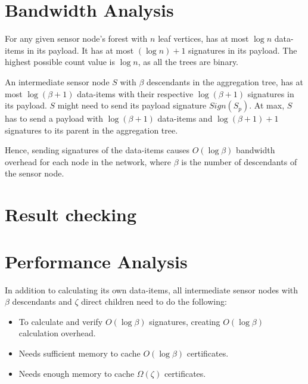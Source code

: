 	
\section{Bandwidth Analysis}
	For any given sensor node's forest with $n$ leaf vertices, has at most $\log n$ data-items in its payload.
	It has at most $(\log n) +1$ signatures in its payload.
	The highest possible count value is $\log n$, as all the trees are binary. 

	An intermediate sensor node $S$ with $\beta$ descendants in the aggregation tree, has at most $\log(\beta+1)$ data-items with their respective $\log(\beta+1)$ signatures in its payload.
	$S$ might need to send its payload signature $Sign(S_{p})$.
	At max, $S$ has to send a payload with $\log(\beta+1)$ data-items and $\log(\beta+1) +1$ signatures to its parent in the aggregation tree.
	
	Hence, sending signatures of the data-items causes $O(\log \beta)$ bandwidth overhead for each node in the network, where $\beta$ is the number of descendants of the sensor node. 
\section{Result checking}

\section{Performance Analysis}
	In addition to calculating its own data-items, all intermediate sensor nodes with $\beta$ descendants and $\zeta$ direct children need to do the following:
	\begin{itemize}
		\item To calculate and verify $O(\log \beta)$ signatures, creating $O(\log \beta)$ calculation overhead. 
		\item Needs sufficient memory to cache $O(\log \beta)$ certificates. 
		\item Needs enough memory to cache $\Omega(\zeta)$ certificates.
	\end{itemize}


